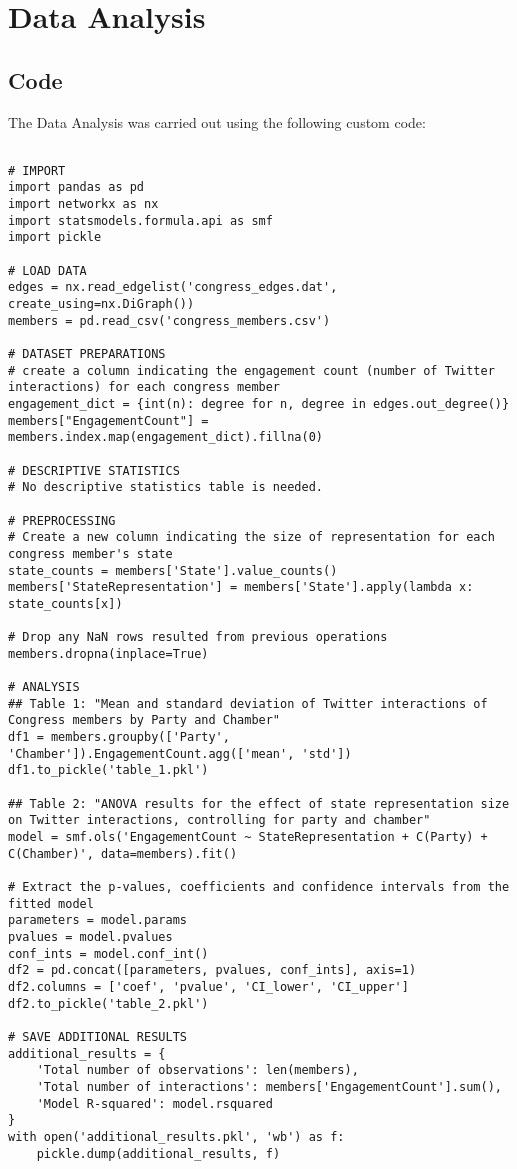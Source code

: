 \documentclass[11pt]{article}
\begin{document}
\section{Data Analysis}
\subsection{{Code}}
The Data Analysis was carried out using the following custom code:

\begin{verbatim}

# IMPORT
import pandas as pd
import networkx as nx
import statsmodels.formula.api as smf
import pickle

# LOAD DATA
edges = nx.read_edgelist('congress_edges.dat', create_using=nx.DiGraph())
members = pd.read_csv('congress_members.csv')

# DATASET PREPARATIONS
# create a column indicating the engagement count (number of Twitter interactions) for each congress member
engagement_dict = {int(n): degree for n, degree in edges.out_degree()}
members["EngagementCount"] = members.index.map(engagement_dict).fillna(0)

# DESCRIPTIVE STATISTICS
# No descriptive statistics table is needed.

# PREPROCESSING 
# Create a new column indicating the size of representation for each congress member's state
state_counts = members['State'].value_counts()
members['StateRepresentation'] = members['State'].apply(lambda x: state_counts[x])

# Drop any NaN rows resulted from previous operations
members.dropna(inplace=True)

# ANALYSIS
## Table 1: "Mean and standard deviation of Twitter interactions of Congress members by Party and Chamber"
df1 = members.groupby(['Party', 'Chamber']).EngagementCount.agg(['mean', 'std'])
df1.to_pickle('table_1.pkl')

## Table 2: "ANOVA results for the effect of state representation size on Twitter interactions, controlling for party and chamber"
model = smf.ols('EngagementCount ~ StateRepresentation + C(Party) + C(Chamber)', data=members).fit()

# Extract the p-values, coefficients and confidence intervals from the fitted model
parameters = model.params
pvalues = model.pvalues
conf_ints = model.conf_int()
df2 = pd.concat([parameters, pvalues, conf_ints], axis=1)
df2.columns = ['coef', 'pvalue', 'CI_lower', 'CI_upper']
df2.to_pickle('table_2.pkl')

# SAVE ADDITIONAL RESULTS
additional_results = {
    'Total number of observations': len(members), 
    'Total number of interactions': members['EngagementCount'].sum(),
    'Model R-squared': model.rsquared
}
with open('additional_results.pkl', 'wb') as f:
    pickle.dump(additional_results, f)

\end{verbatim}
\end{document}
